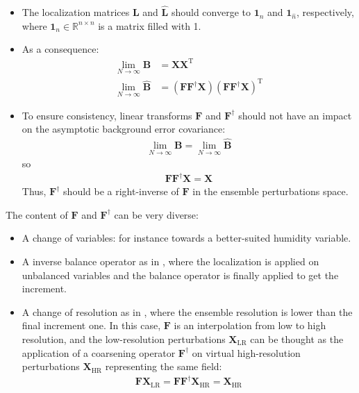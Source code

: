 \documentclass[12pt]{scrartcl}
\begin{document}
\begin{itemize}
\item The localization matrices $\mathbf{L}$ and $\widehat{\mathbf{L}}$ should converge to $\mathbf{1}_n$ and $\mathbf{1}_{\widehat{n}}$, respectively, where $\mathbf{1}_n \in \mathbb{R}^{n \times n}$ is a matrix filled with 1.
\item As a consequence:
\begin{align}
\lim_{N \rightarrow \infty} \mathbf{B} & = \mathbf{X} \mathbf{X}^\mathrm{T} \\
\lim_{N \rightarrow \infty} \widehat{\mathbf{B}} & = \left(\mathbf{F} \mathbf{F}^\dag \mathbf{X}\right) \left(\mathbf{F} \mathbf{F}^\dag \mathbf{X}\right)^\mathrm{T}
\end{align}
\item To ensure consistency, linear transforms $\mathbf{F}$ and $\mathbf{F}^\dag$ should not have an impact on the asymptotic background error covariance:
\begin{align}
\lim_{N \rightarrow \infty} \mathbf{B} = \lim_{N \rightarrow \infty} \widehat{\mathbf{B}}
\end{align}
so
\begin{align}
\mathbf{F} \mathbf{F}^\dag \mathbf{X} = \mathbf{X}
\end{align}
Thus, $\mathbf{F}^\dag$ should be a right-inverse of $\mathbf{F}$ in the ensemble perturbations space.
\end{itemize}

The content of $\mathbf{F}$ and $\mathbf{F}^\dag$ can be very diverse:
\begin{itemize}
\item A change of variables: for instance towards a better-suited humidity variable.
\item A inverse balance operator as in \citet{clayton_2012}, where the localization is applied on unbalanced variables and the balance operator is finally applied to get the increment.
\item A change of resolution as in \citet{kleist_2014a}, where the ensemble resolution is lower than the final increment one. In this case, $\mathbf{F}$ is an interpolation from low to high resolution, and the low-resolution perturbations $\mathbf{X}_\mathrm{LR}$ can be thought as the application of a coarsening operator $\mathbf{F}^\dag$ on virtual high-resolution perturbations $\mathbf{X}_\mathrm{HR}$ representing the same field:
\begin{align}
\mathbf{F} \mathbf{X}_\mathrm{LR} = \mathbf{F} \mathbf{F}^\dag \mathbf{X}_\mathrm{HR} = \mathbf{X}_\mathrm{HR}
\end{align}
\end{itemize}
\end{document}
